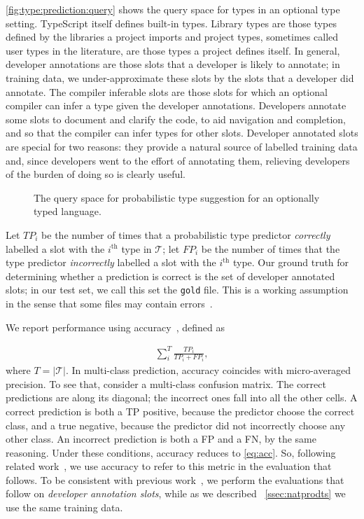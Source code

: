 \documentclass[acmsmall,nonacm]{acmart}\settopmatter{printfolios=true,printccs=false,printacmref=false}
\begin{document}
\autoref{fig:type:prediction:query} shows the query space for types in an optional type setting.
TypeScript itself defines built-in types.  Library types are those types defined by the libraries a project imports and project types, sometimes called user types in the literature, are those types a project defines itself. 
In general, developer annotations are those slots that a developer is likely to annotate; in training data, we under-approximate these slots by the slots that a developer did annotate. 
The compiler inferable slots are those slots for which an optional compiler can infer a type given the developer annotations.  
Developers annotate some slots to document and clarify the code, to aid navigation and completion, and so that the compiler can infer types for other slots.  
Developer annotated slots are special for two reasons:  they provide a natural source of labelled training data and, since developers went to the effort of annotating them, relieving developers of the burden of doing so is clearly useful.

\begin{figure}[t]
    \centering
    \def\svgwidth{0.8\linewidth}
    
    \caption{The query space for probabilistic type suggestion for an optionally typed language.}
    \label{fig:type:prediction:query}
\end{figure}

Let $\mathit{TP_i}$ be the number of times that a probabilistic type predictor \emph{correctly} labelled a slot with the $i^\text{th}$ type in $\mathcal{T}$;  let $\mathit{FP_i}$ be the number of times that the type predictor \emph{incorrectly} labelled a slot with the $i^\text{th}$ type.  Our ground truth for determining whether a prediction is correct is the set of developer annotated slots; in our test set, we call this set the \texttt{gold} file. 
This is a working assumption in the sense that some files may contain errors~\cite{williams17}.

We report performance using accuracy~\cite{manning}, defined as 

\begin{align}\label{eq:acc}
    \sum_i^T \frac{\mathit{TP_i}}{\mathit{TP_i} + \mathit{FP_i}},
\end{align}
where $T=|\mathcal{T}|$. In multi-class prediction, accuracy  coincides with micro-averaged precision. To see that, consider a multi-class confusion matrix.  The correct predictions are along its diagonal; the incorrect ones fall into all the other cells.  A correct prediction is both a TP positive, because the predictor choose the correct class, and a true negative, because the predictor did not incorrectly choose any other class.  An incorrect prediction is both a FP and a FN, by the same reasoning.  Under these conditions, accuracy reduces to \eqref{eq:acc}.
So, following related work~\cite{wei20}, we use accuracy to refer to this metric in the evaluation that follows.  To be consistent with previous work~\citep{wei20,hellendoorn18}, we perform the evaluations that follow on \textit{developer annotation slots}, while as we described
~\cref{ssec:natprodts} we use the same training data.
\end{document}
